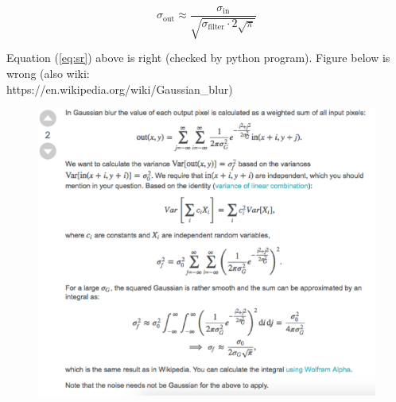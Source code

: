 \documentclass[11pt, a4paper]{article}  %
\begin{document}
\begin{CJK}{UTF8}{gbsn}
\begin{equation}
	\sigma_{\text{out}} \approx \frac{\sigma_{\text{in}}}{\sqrt{\sigma_{\text{filter}} \cdot 2\sqrt{\pi}}}
\label{eq:sr}
\end{equation}

Equation (\ref{eq:sr}) above is right (checked by python program). Figure below is wrong (also wiki: \\
https://en.wikipedia.org/wiki/Gaussian\_blur)

\begin{figure}[H]
\center
\includegraphics[width=11.5cm]{gaussian_blur-smoothing-filter.eps}
\end{figure}



\end{CJK}
\end{document}
